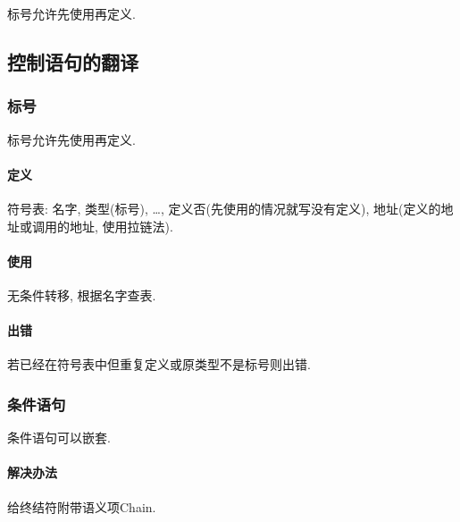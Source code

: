         标号允许先使用再定义.

    \subsection{控制语句的翻译}

        \subsubsection{标号}

           标号允许先使用再定义.

            \paragraph{定义}

                符号表: 名字, 类型(标号), \ldots, 定义否(先使用的情况就写没有定义), 地址(定义的地址或调用的地址, 使用拉链法).

            \paragraph{使用}

                无条件转移, 根据名字查表.

            \paragraph{出错}

                若已经在符号表中但重复定义或原类型不是标号则出错.

        \subsubsection{条件语句}

            条件语句可以嵌套.

            \paragraph{解决办法}

                给终结符附带语义项Chain.
